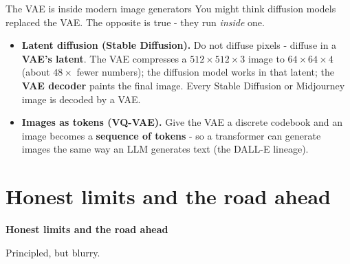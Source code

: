 \documentclass[aspectratio=169]{beamer}
\begin{document}
\begin{frame}{The VAE is inside modern image generators}
  \small
  You might think diffusion models replaced the VAE. The opposite is true - they run
  \emph{inside} one.
  \vskip 4pt
  \begin{itemize}
    \item \textbf{Latent diffusion (Stable Diffusion).} Do not diffuse pixels - diffuse in a
      \textbf{VAE's latent}. The VAE compresses a $512\times512\times3$ image to
      $64\times64\times4$ (about $48\times$ fewer numbers); the diffusion model works in that
      latent; the \textbf{VAE decoder} paints the final image. Every Stable Diffusion or
      Midjourney image is decoded by a VAE.
    \item \textbf{Images as tokens (VQ-VAE).} Give the VAE a discrete codebook and an image
      becomes a \textbf{sequence of tokens} - so a transformer can generate images the same
      way an LLM generates text (the DALL-E lineage).
  \end{itemize}
  \vskip 4pt
\end{frame}

\section{Honest limits and the road ahead}

\begin{frame}[plain]
  \vfill
  \begin{center}
    {\Large\color{popblue}\textbf{Honest limits and the road ahead}}\\[0.9em]
    \begin{minipage}{0.82\textwidth}\centering\small
      Principled, but blurry.
    \end{minipage}
  \end{center}
  \vfill
\end{frame}
\end{document}
